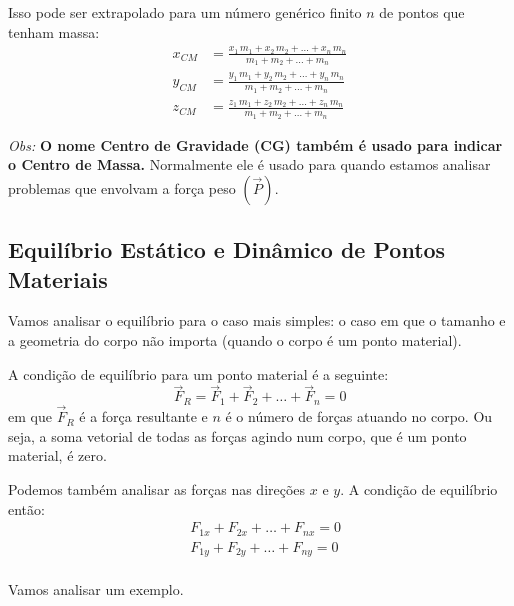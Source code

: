 \documentclass[12pt]{extarticle}
\newcommand{\<}{\langle}
\renewcommand{\>}{\rangle}
\theoremstyle{definition}
\begin{document}
Isso pode ser extrapolado para um número genérico finito $n$ de pontos que tenham massa:
\begin{equation}
    \begin{split}
        x_{CM} &= \frac{x_1\,m_1 + x_2\,m_2 + \dots + x_n\,m_n}{m_1+m_2+ \dots+ m_n}\\
        y_{CM} &= \frac{y_1\,m_1 + y_2\,m_2 + \dots + y_n\,m_n}{m_1+m_2+\dots+m_n}\\
        z_{CM} &= \frac{z_1\,m_1 + z_2\,m_2 + \dots + z_n\,m_n}{m_1+m_2+\dots+ m_n}
    \end{split}
\end{equation}

\textit{Obs:} \textbf{O nome Centro de Gravidade (CG) também é usado para indicar o Centro de Massa.} Normalmente ele é usado para quando estamos analisar problemas que envolvam a força peso $(\vec{P})$.

\subsection{Equilíbrio Estático e Dinâmico de Pontos Materiais}
Vamos analisar o equilíbrio para o caso mais simples: o caso em que o tamanho e a geometria do corpo não importa (quando o corpo é um ponto material).

A condição de equilíbrio para um ponto material é a seguinte:
\begin{equation}\label{eq:equilibrium}
    \vec{F}_R=\vec{F}_1 + \vec{F}_2 + \dots + \vec{F}_n = 0
\end{equation}
\noindent em que $\vec{F}_R$ é a força resultante e $n$ é o número de forças atuando no corpo. Ou seja, a soma vetorial de todas as forças agindo num corpo, que é um ponto material, é zero.

Podemos também analisar as forças nas direções $x$ e $y$. A condição de equilíbrio então:
\begin{equation}\label{eq:equilibrium_xy}
    \begin{split}
        &F_{1x} + F_{2x} + \dots + F_{nx} = 0\\
        &F_{1y} + F_{2y} + \dots + F_{ny} = 0\\
    \end{split}
\end{equation}

Vamos analisar um exemplo.
\end{document}
